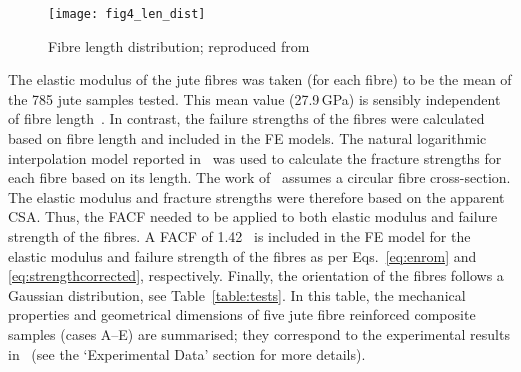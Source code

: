 	\begin{figure}[!h]
		\centering
		\texttt{[image: fig4\_len\_dist]}
		\caption{Fibre length distribution; reproduced from~\autocite{Virk.2009}}\label{fig:len}
	\end{figure}
		
	The elastic modulus of the jute fibres was taken (for each fibre) to be the mean of the 785 jute samples tested. This mean value (27.9\,GPa) is sensibly independent of fibre length~\autocite{Virk.2013}. In contrast, the failure strengths of the fibres were calculated based on fibre length and included in the FE models. The natural logarithmic interpolation model reported in~\autocite{Virk.2011} was used to calculate the fracture strengths for each fibre based on its length. The work of~\autocite{Virk.2011,Virk.2013} assumes a circular fibre cross-section. The elastic modulus and fracture strengths were therefore based on the apparent CSA. Thus, the FACF needed to be applied to both elastic modulus and failure strength of the fibres. A FACF of 1.42~\autocite{Virk.2010b} is included in the FE model for the elastic modulus and failure strength of the fibres as per Eqs.~\eqref{eq:enrom} and \eqref{eq:strengthcorrected}, respectively. Finally, the orientation of the fibres follows a Gaussian distribution, see Table~\ref{table:tests}. In this table, the mechanical properties and geometrical dimensions of five jute fibre reinforced composite samples (cases A--E) are summarised; they correspond to the experimental results in~\autocite{Virk.2013} (see the `Experimental Data' section for more details).

